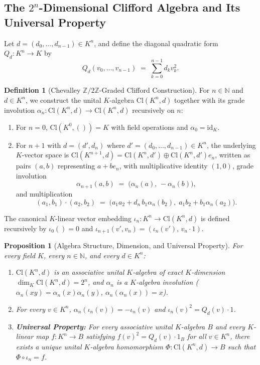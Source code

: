 \documentclass[11pt,a4paper]{article}
\theoremstyle{plain}
\newtheorem{proposition}[theorem]{Proposition}
\theoremstyle{definition}
\newtheorem{definition}[theorem]{Definition}
\newcommand{\Cl}{\mathrm{Cl}}
\newcommand{\Z}{\mathbb{Z}}
\begin{document}
\subsection{The \texorpdfstring{$2^n$}{2\^{}n}-Dimensional Clifford Algebra and Its Universal Property}

Let $d = (d_0, \dots, d_{n-1}) \in K^n$, and define the diagonal quadratic form $Q_d : K^n \to K$ by
\begin{equation}\label{eq:quadform}
  Q_d(v_0, \dots, v_{n-1}) \;=\; \sum_{k=0}^{n-1} d_k v_k^2.
\end{equation}

\begin{definition}[Chevalley $\Z/2\Z$-Graded Clifford Construction]\label{def:clifford}
For $n \in \mathbb{N}$ and $d \in K^n$, we construct the unital $K$-algebra $\Cl(K^n, d)$ together with its grade involution $\alpha_n : \Cl(K^n, d) \to \Cl(K^n, d)$ recursively on $n$:
\begin{enumerate}
  \item For $n = 0$, $\Cl(K^0, ()) = K$ with field operations and $\alpha_0 = \mathrm{id}_K$.
  \item For $n + 1$ with $d = (d', d_n)$ where $d' = (d_0, \dots, d_{n-1}) \in K^n$, the underlying $K$-vector space is $\Cl(K^{n+1}, d) = \Cl(K^n, d') \oplus \Cl(K^n, d') e_n$, written as pairs $(a, b)$ representing $a + b e_n$, with multiplicative identity $(1, 0)$, grade involution
  \[
    \alpha_{n+1}(a, b) \;=\; \bigl(\alpha_n(a),\, -\alpha_n(b)\bigr),
  \]
  and multiplication
  \begin{equation}\label{eq:chevalley-mul}
    (a_1, b_1) \cdot (a_2, b_2)
    \;=\;
    \bigl(a_1 a_2 + d_n\, b_1 \alpha_n(b_2),\; a_1 b_2 + b_1 \alpha_n(a_2)\bigr).
  \end{equation}
\end{enumerate}
The canonical $K$-linear vector embedding $\iota_n : K^n \to \Cl(K^n, d)$ is defined recursively by $\iota_0() = 0$ and $\iota_{n+1}(v', v_n) = (\iota_n(v'),\, v_n \cdot 1)$.
\end{definition}

\begin{proposition}[Algebra Structure, Dimension, and Universal Property]\label{prop:universal}
For every field $K$, every $n \in \mathbb{N}$, and every $d \in K^n$:
\begin{enumerate}
  \item $\Cl(K^n, d)$ is an associative unital $K$-algebra of exact $K$-dimension $\dim_K \Cl(K^n, d) = 2^n$, and $\alpha_n$ is a $K$-algebra involution ($\alpha_n(xy)=\alpha_n(x)\alpha_n(y)$, $\alpha_n(\alpha_n(x))=x$).
  \item For every $v \in K^n$, $\alpha_n(\iota_n(v)) = -\iota_n(v)$ and $\iota_n(v)^2 = Q_d(v) \cdot 1$.
  \item \textbf{Universal Property:} For every associative unital $K$-algebra $B$ and every $K$-linear map $f : K^n \to B$ satisfying $f(v)^2 = Q_d(v) \cdot 1_B$ for all $v \in K^n$, there exists a \emph{unique} unital $K$-algebra homomorphism $\Phi : \Cl(K^n, d) \to B$ such that $\Phi \circ \iota_n = f$.
\end{enumerate}
\end{proposition}
\end{document}
